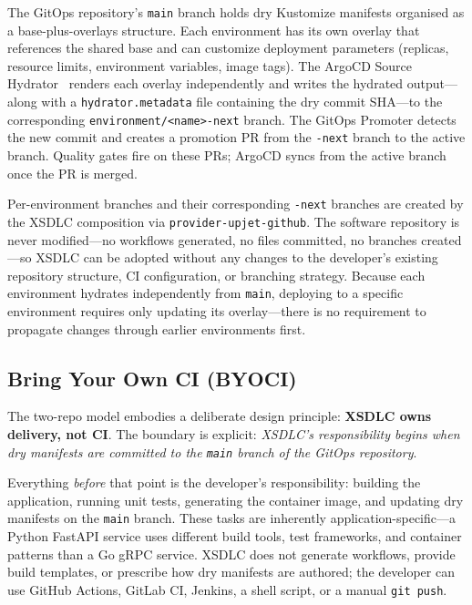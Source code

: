 The GitOps repository's \texttt{main} branch holds dry Kustomize manifests organised as a base-plus-overlays structure. Each environment has its own overlay that references the shared base and can customize deployment parameters (replicas, resource limits, environment variables, image tags). The ArgoCD Source Hydrator~\cite{argocd-hydrator} renders each overlay independently and writes the hydrated output---along with a \texttt{hydrator.metadata} file containing the dry commit SHA---to the corresponding \texttt{environment/<name>-next} branch. The GitOps Promoter detects the new commit and creates a promotion PR from the \texttt{-next} branch to the active branch. Quality gates fire on these PRs; ArgoCD syncs from the active branch once the PR is merged.

Per-environment branches and their corresponding \texttt{-next} branches are created by the XSDLC composition via \texttt{provider-upjet-github}. The software repository is never modified---no workflows generated, no files committed, no branches created---so XSDLC can be adopted without any changes to the developer's existing repository structure, CI configuration, or branching strategy. Because each environment hydrates independently from \texttt{main}, deploying to a specific environment requires only updating its overlay---there is no requirement to propagate changes through earlier environments first.

\subsection{Bring Your Own CI (BYOCI)}
\label{subsec:byoci}

The two-repo model embodies a deliberate design principle: \textbf{XSDLC owns delivery, not CI}. The boundary is explicit: \textit{XSDLC's responsibility begins when dry manifests are committed to the \texttt{main} branch of the GitOps repository}.

Everything \textit{before} that point is the developer's responsibility: building the application, running unit tests, generating the container image, and updating dry manifests on the \texttt{main} branch. These tasks are inherently application-specific---a Python FastAPI service uses different build tools, test frameworks, and container patterns than a Go gRPC service. XSDLC does not generate workflows, provide build templates, or prescribe how dry manifests are authored; the developer can use GitHub Actions, GitLab CI, Jenkins, a shell script, or a manual \texttt{git push}.

